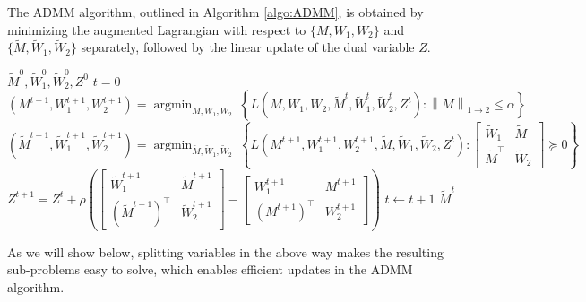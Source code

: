 \documentclass[11pt]{article}
\newcommand{\norm}[1]{\left \|#1 \right \|}
\begin{document}
The ADMM algorithm, outlined in Algorithm \ref{algo:ADMM}, is obtained by minimizing the augmented Lagrangian with respect to $\{M, W_1, W_2\}$ and $\{\widetilde{M}, \widetilde{W}_1, \widetilde{W}_2\}$ separately, followed by the linear update of the dual variable $Z$. 
\begin{algorithm}[t]
\caption{ADMM algorithm for mixed-norm-based estimator}
\label{algo:ADMM}
\begin{algorithmic}
 $\widetilde{M}^0, \widetilde{W}_1^0, \widetilde{W}_2^0, Z^0$
 $t = 0$ 
\STATE $(M^{t+1}, W_1^{t+1}, W_2^{t+1}) = \displaystyle \mathop{\text{argmin}}_{M,W_1,W_2} \ \left\{ L(M,W_1,W_2,\widetilde{M}^{t},\widetilde{W}_1^{t},\widetilde{W}_2^{t},Z^{t}) : \norm{M}_{1 \rightarrow 2} \leq \alpha \right\}$
\STATE $(\widetilde{M}^{t+1}, \widetilde{W}_1^{t+1}, \widetilde{W}_2^{t+1}) = \displaystyle \mathop{\text{argmin}}_{\widetilde{M},\widetilde{W}_1,\widetilde{W}_2} \ \left\{ L(M^{t+1},W_1^{t+1},W_2^{t+1},\widetilde{M},\widetilde{W}_1,\widetilde{W}_2,Z^{t}) : \begin{bmatrix} \widetilde{W}_1 & \widetilde{M} \\ \widetilde{M}^\top & \widetilde{W}_2 \end{bmatrix} \succeq 0 \right\}$
\STATE $\displaystyle Z^{t+1} = Z^t  +\rho\left( \begin{bmatrix} \widetilde{W}_1^{t+1} & \widetilde{M}^{t+1} \\ (\widetilde{M}^{t+1})^\top & \widetilde{W}_2^{t+1} \end{bmatrix} - \begin{bmatrix} W_1^{t+1} & M^{t+1} \\ (M^{t+1})^\top & W_2^{t+1} \end{bmatrix} \right)$
\STATE $t \leftarrow t+1$
\ENDWHILE
{} $\widetilde{M}^t$
\end{algorithmic}
\end{algorithm}
As we will show below, splitting variables in the above way makes the resulting sub-problems easy to solve, which enables efficient updates in the ADMM algorithm. \\
\end{document}
